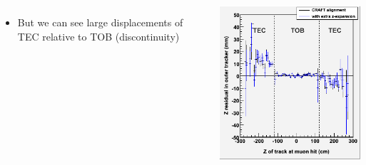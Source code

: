 \documentclass[compress]{beamer}
\begin{document}
\begin{frame}
\begin{columns}
\begin{itemize}
\item But we can see large displacements of TEC relative to TOB (discontinuity)
\end{itemize}

\includegraphics[width=\linewidth]{resid_from_tracker_outer_zexpand.png}

\end{columns}
\end{frame}
\end{document}
